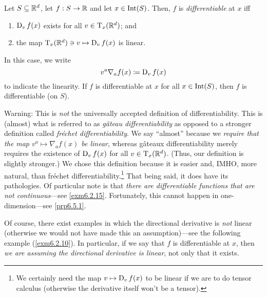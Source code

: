 \begin{dfn}\label{Derivative}
\begin{savenotes}
Let $S\subseteq \R ^d$, let $f:S\rightarrow \R$ and let $x\in \Int (S)$.  Then, $f$ is \emph{differentiable} at $x$ iff
\begin{enumerate}
\item $\D _vf(x)$ exists for all $v\in \tangent{\R ^d}{x}$; and
\item the map $\tangent{\R ^d}{x}\ni v\mapsto \D _vf(x)$ is linear.
\end{enumerate}
In this case, we write
\begin{equation}
v^a\nabla _af(x)\coloneqq \D _vf(x)
\end{equation}
 to indicate the linearity.  If $f$ is differentiable at $x$ for all $x\in \Int (S)$, then $f$ is differentiable (on $S$).
\begin{rmk}
Warning:  This is \emph{not} the universally accepted definition of differentiability.  This is (almost) what is referred to as \emph{g\^{a}teau differentiability} as opposed to a stronger definition called \emph{fr\'{e}chet differentiability}.  We say ``almost'' because we \emph{require that the map $v^a\mapsto \nabla _af(x)$ be linear}, whereas g\^{a}teaux differentiability merely requires the existence of $\D _vf(x)$ for all $v\in \tangent{\R ^d}{x}$.  (Thus, our definition is slightly stronger.)  We chose this definition because it is easier and, IMHO, more natural, than fr\'{e}chet differentiability.\footnote{We certainly need the map $v\mapsto \D _vf(x)$ to be linear if we are to do tensor calculus (otherwise the derivative itself won't be a tensor).}  That being said, it does have its pathologies.  Of particular note is that \emph{there are differentiable functions that are not continuous}---see \cref{exm6.2.15}.  Fortunately, this cannot happen in one-dimension---see \cref{prp6.5.1}.
\end{rmk}
\begin{rmk}
Of course, there exist examples in which the directional derivative is \emph{not} linear (otherwise we would not have made this an assumption)---see the following example (\cref{exm6.2.10}).  In particular, if we say that $f$ is differentiable at $x$, then \emph{we are assuming the directional derivative is linear}, not only that it exists.


\end{rmk}
\end{savenotes}
\end{dfn}
